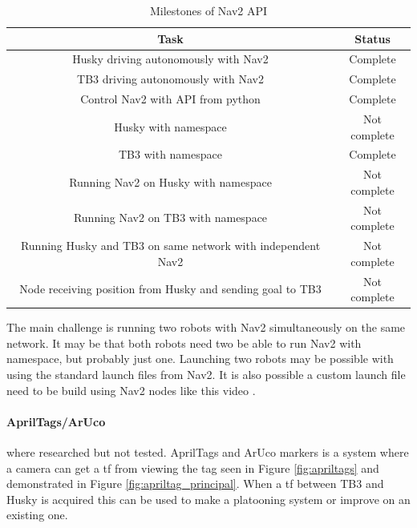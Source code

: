 \begin{table}[H]
    \centering
    \begin{tabular}{c|c}
        Task                                                        & Status   \\ \hline
        Husky driving autonomously with Nav2                        & Complete \\
        TB3 driving autonomously with Nav2                          & Complete \\
        Control Nav2 with API from python                           & Complete \\
        Husky with namespace                                        & Not complete \\
        TB3 with namespace                                          & Complete \\
        Running Nav2 on Husky with namespace                        & Not complete \\
        Running Nav2 on TB3 with namespace                          & Not complete \\
        Running Husky and TB3 on same network with independent Nav2 & Not complete\\
        Node receiving position from Husky and sending goal to TB3  & Not complete \\
    \end{tabular}
    \caption{Milestones of Nav2 API}
    \label{tab:MilestonesNav2API}
\end{table}

The main challenge is running two robots with Nav2 simultaneously on the same network. It may be that both robots need two be able to run Nav2 with namespace, but probably just one. Launching two robots may be possible with using the standard launch files from Nav2. It is also possible a custom launch file need to be build using Nav2 nodes like this video \cite{MultiRobotNav2}.
   

\paragraph{AprilTags/ArUco} where researched but not tested. AprilTags and ArUco markers is a system where a camera can get a tf from viewing the tag seen in Figure \ref{fig:apriltags} and demonstrated in Figure \ref{fig:apriltag_principal}. When a tf between TB3 and Husky is acquired this can be used to make a platooning system or improve on an existing one. 


